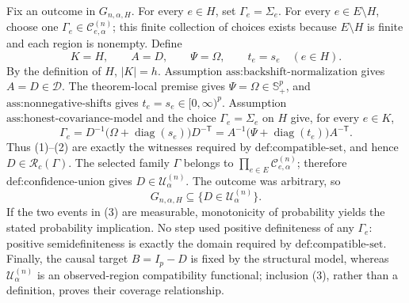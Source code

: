 Fix an outcome in \(G_{n,\alpha,H}\). For every \(e\in H\), set \(\Gamma_e=\Sigma_e\). For every \(e\in E\setminus H\), choose one \(\Gamma_e\in\mathcal C^{(n)}_{e,\alpha}\); this finite collection of choices exists because \(E\setminus H\) is finite and each region is nonempty. Define
\[
K=H,\qquad A=D,\qquad \Psi=\Omega,
\qquad t_e=s_e\quad(e\in H).
\tag{1}
\]
By the definition of \(H\), \(|K|=h\). Assumption \(\text{ass:backshift-normalization}\) gives \(A=D\in\mathcal D\). The theorem-local premise gives \(\Psi=\Omega\in\mathbb S_+^p\), and \(\text{ass:nonnegative-shifts}\) gives \(t_e=s_e\in[0,\infty)^p\). Assumption \(\text{ass:honest-covariance-model}\) and the choice \(\Gamma_e=\Sigma_e\) on \(H\) give, for every \(e\in K\),
\[
\Gamma_e
=D^{-1}\bigl(\Omega+\operatorname{diag}(s_e)\bigr)D^{-\mathsf T}
=A^{-1}\bigl(\Psi+\operatorname{diag}(t_e)\bigr)A^{-\mathsf T}.
\tag{2}
\]
Thus (1)--(2) are exactly the witnesses required by \(\text{def:compatible-set}\), and hence \(D\in\mathcal R_c(\Gamma)\). The selected family \(\Gamma\) belongs to \(\prod_{e\in E}\mathcal C^{(n)}_{e,\alpha}\); therefore \(\text{def:confidence-union}\) gives \(D\in\mathcal U^{(n)}_\alpha\). The outcome was arbitrary, so
\[
G_{n,\alpha,H}\subseteq\{D\in\mathcal U^{(n)}_\alpha\}.
\tag{3}
\]
If the two events in (3) are measurable, monotonicity of probability yields the stated probability implication. No step used positive definiteness of any \(\Gamma_e\): positive semidefiniteness is exactly the domain required by \(\text{def:compatible-set}\). Finally, the causal target \(B=I_p-D\) is fixed by the structural model, whereas \(\mathcal U^{(n)}_\alpha\) is an observed-region compatibility functional; inclusion (3), rather than a definition, proves their coverage relationship.